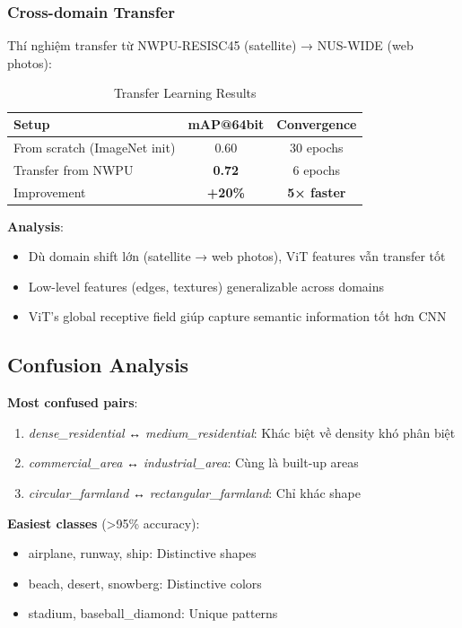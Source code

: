 \documentclass[12pt,a4paper]{article}
\begin{document}
\subsubsection{Cross-domain Transfer}

Thí nghiệm transfer từ NWPU-RESISC45 (satellite) → NUS-WIDE (web photos):

\begin{table}[H]
\centering
\caption{Transfer Learning Results}
\begin{tabular}{lcc}
\toprule
\textbf{Setup} & \textbf{mAP@64bit} & \textbf{Convergence} \\
\midrule
From scratch (ImageNet init) & 0.60 & 30 epochs \\
Transfer from NWPU & \textbf{0.72} & 6 epochs \\
\midrule
Improvement & \textbf{+20\%} & \textbf{5× faster} \\
\bottomrule
\end{tabular}
\end{table}

\textbf{Analysis}:
\begin{itemize}
    \item Dù domain shift lớn (satellite → web photos), ViT features vẫn transfer tốt
    \item Low-level features (edges, textures) generalizable across domains
    \item ViT's global receptive field giúp capture semantic information tốt hơn CNN
\end{itemize}

\subsection{Confusion Analysis}

\textbf{Most confused pairs}:
\begin{enumerate}
    \item \textit{dense\_residential} ↔ \textit{medium\_residential}: Khác biệt về density khó phân biệt
    \item \textit{commercial\_area} ↔ \textit{industrial\_area}: Cùng là built-up areas
    \item \textit{circular\_farmland} ↔ \textit{rectangular\_farmland}: Chỉ khác shape
\end{enumerate}

\textbf{Easiest classes} (>95\% accuracy):
\begin{itemize}
    \item airplane, runway, ship: Distinctive shapes
    \item beach, desert, snowberg: Distinctive colors
    \item stadium, baseball\_diamond: Unique patterns
\end{itemize}
\end{document}
